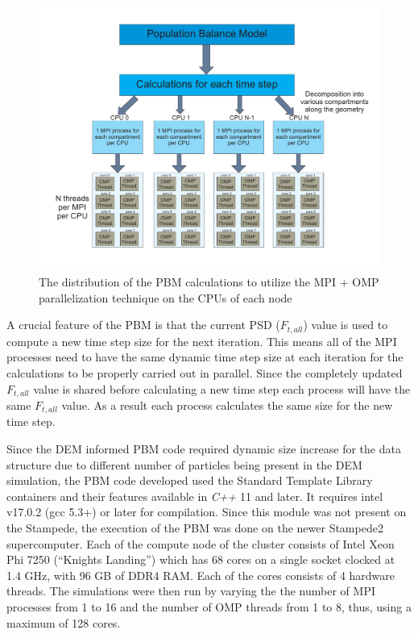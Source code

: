 \documentclass[preprint,11pt,authoryear]{elsarticle}
\begin{document}
\begin{figure}
\centering
\includegraphics[scale=0.45]{PBM_decomposition.pdf}
\caption{The distribution of the PBM calculations to utilize the MPI + OMP parallelization technique on the CPUs of each node}
\label{fig:mthds_PBM_decompostion}
\end{figure}

A crucial feature of the PBM is that the current PSD ($F_{t,all}$) value is used to compute a new 
time step size for the next iteration. This means all of the MPI processes need to have the same 
dynamic time step size at each iteration for the calculations to be properly carried out in parallel. Since 
the completely updated $F_{t,all}$ value is shared before calculating a new time step each process will 
have the same $F_{t,all}$ value. As a result each process calculates the same size for the new time 
step. 

Since the DEM informed PBM code required dynamic size increase for the data structure due to different number of particles being 
present in the DEM simulation,
the PBM code developed used the Standard Template Library containers and their features available in \textit{C++} 11 
and later. It requires intel v17.0.2 (gcc 5.3+)  or later for compilation. Since this module was not present on the 
Stampede, the execution of the PBM was done on the newer Stampede2 supercomputer. Each of the compute node of the 
cluster consists of Intel Xeon Phi 7250 (\textquotedblleft Knights Landing\textquotedblright) which has 68 cores on 
a single socket clocked at 1.4 GHz, with 96 GB of DDR4 RAM. Each of the cores consists of 4 hardware threads. 
The simulations were then run by varying the the number of MPI processes from 1 to 16 and the number of OMP threads 
from 1 to 8, thus, using a maximum of 128 cores.
\end{document}
